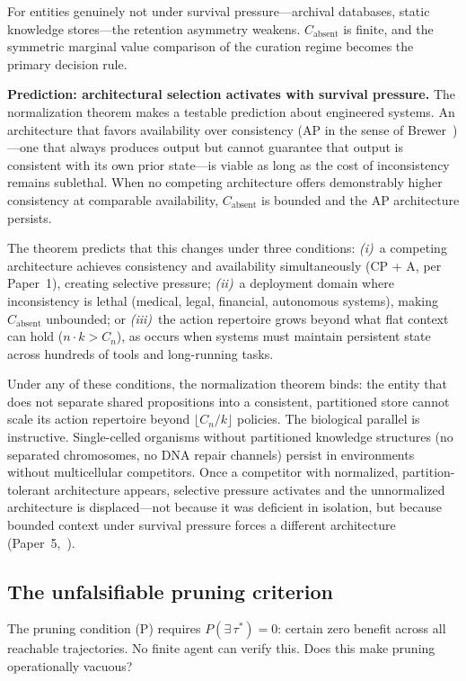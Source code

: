 \documentclass[11pt]{article}
\theoremstyle{definition}
\theoremstyle{remark}
\begin{document}
For entities genuinely not under survival pressure---archival databases,
static knowledge stores---the retention asymmetry weakens.
$C_{\text{absent}}$ is finite, and the symmetric marginal value
comparison of the curation regime becomes the primary decision rule.

\textbf{Prediction: architectural selection activates with survival
pressure.} The normalization theorem makes a testable prediction about
engineered systems. An architecture that favors availability over
consistency (AP in the sense of Brewer~\cite{Brewer2000})---one that
always produces output but cannot guarantee that output is consistent
with its own prior state---is viable as long as the cost of
inconsistency remains sublethal. When no competing architecture
offers demonstrably higher consistency at comparable availability,
$C_{\text{absent}}$ is bounded and the AP architecture persists.

The theorem predicts that this changes under three conditions:
\emph{(i)}~a competing architecture achieves consistency and
availability simultaneously (CP + A, per Paper~1), creating selective
pressure; \emph{(ii)}~a deployment domain where inconsistency is
lethal (medical, legal, financial, autonomous systems), making
$C_{\text{absent}}$ unbounded; or \emph{(iii)}~the action repertoire
grows beyond what flat context can hold ($n \cdot k > C_n$), as
occurs when systems must maintain persistent state across hundreds of
tools and long-running tasks.

Under any of these conditions, the normalization theorem binds: the
entity that does not separate shared propositions into a consistent,
partitioned store cannot scale its action repertoire beyond
$\lfloor C_n / k \rfloor$ policies. The biological parallel is
instructive. Single-celled organisms without partitioned knowledge
structures (no separated chromosomes, no DNA repair channels) persist
in environments without multicellular competitors. Once a competitor
with normalized, partition-tolerant architecture appears, selective
pressure activates and the unnormalized architecture is displaced---not
because it was deficient in isolation, but because bounded context under
survival pressure forces a different architecture
(Paper~5,~\cite{McCarthy2026e}).

\subsection{The unfalsifiable pruning criterion}

The pruning condition (P) requires $P(\exists\,\tau^*) = 0$: certain
zero benefit across all reachable trajectories. No finite agent can
verify this. Does this make pruning operationally vacuous?
\end{document}
